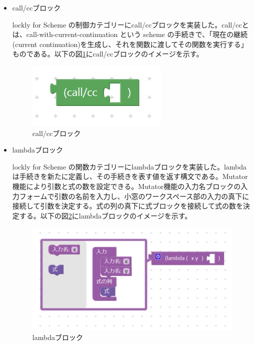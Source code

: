 \documentclass{risepaper}
\begin{document}
\begin{itemize}
\item call/ccブロック

lockly for Scheme の制御カテゴリーにcall/ccブロックを実装した。call/ccとは、call-with-current-continuation という scheme の手続きで、「現在の継続(current continuation)を生成し、それを関数に渡してその関数を実行する」ものである。以下の図\ref{fig:scheme_callcc}にcall/ccブロックのイメージを示す。

\begin{figure}[h]
\begin{center}
\includegraphics[scale=0.8]{img/scheme_callcc.PNG}
\caption{call/ccブロック}%
\label{fig:scheme_callcc}
\end{center}%
\end{figure}%

\item lambdaブロック

lockly for Scheme の関数カテゴリーにlambdaブロックを実装した。lambdaは手続きを新たに定義し、その手続きを表す値を返す構文である。Mutator機能により引数と式の数を設定できる。Mutator機能の入力名ブロックの入力フォームで引数の名前を入力し、小窓のワークスペース部の入力の真下に接続して引数を決定する。式の列の真下に式ブロックを接続して式の数を決定する。以下の図\ref{fig:scheme_lambda}にlambdaブロックのイメージを示す。

\begin{figure}[h]
\begin{center}
\includegraphics[scale=0.8]{img/scheme_lambda.PNG}
\caption{lambdaブロック}%
\label{fig:scheme_lambda}
\end{center}%
\end{figure}%


\end{itemize}
\end{document}
